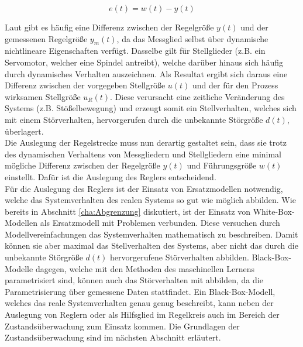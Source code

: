 \begin{equation}
e(t) = w(t) - y(t)
\end{equation}


Laut \cite{Lunze.2013} gibt es häufig eine Differenz zwischen der Regelgröße $y(t)$ und der gemessenen Regelgröße $y_m(t)$, da das Messglied selbst über dynamische nichtlineare Eigenschaften verfügt. Dasselbe gilt für Stellglieder (z.B. ein Servomotor, welcher eine Spindel antreibt), welche darüber hinaus sich häufig durch dynamisches Verhalten auszeichnen. Als Resultat ergibt sich daraus eine Differenz zwischen der vorgegeben Stellgröße $u(t)$ und der für den Prozess wirksamen Stellgröße $u_R(t)$. Diese verursacht eine zeitliche Veränderung des Systems (z.B. Stößelbewegung) und erzeugt somit ein Stellverhalten, welches sich mit einem Störverhalten, hervorgerufen durch die unbekannte Störgröße $d(t)$, überlagert. \cite{Lunze.2013} \\ 
Die Auslegung der Regelstrecke muss nun derartig gestaltet sein, dass sie trotz des dynamischen Verhaltens von Messgliedern und Stellgliedern eine minimal mögliche Differenz zwischen der Regelgröße $y(t)$ und Führungsgröße $w(t)$ einstellt. Dafür ist die Auslegung des Reglers entscheidend. \\ 
Für die Auslegung des Reglers ist der Einsatz von Ersatzmodellen notwendig, welche das Systemverhalten des realen Systems so gut wie möglich abbilden. Wie bereits in Abschnitt \ref{cha:Abgrenzung} diskutiert, ist der Einsatz von White-Box-Modellen als Ersatzmodell mit Problemen verbunden. Diese versuchen durch Modellvereinfachungen das Systemverhalten mathematisch zu beschreiben. Damit können sie aber maximal das Stellverhalten des Systems, aber nicht das durch die unbekannte Störgröße $d(t)$ hervorgerufene Störverhalten abbilden. Black-Box-Modelle dagegen, welche mit den Methoden des maschinellen Lernens parametrisiert sind, können auch das Störverhalten mit abbilden, da die Parametrisierung über gemessene Daten stattfindet. Ein Black-Box-Modell, welches das reale Systemverhalten genau genug beschreibt, kann neben der Auslegung von Reglern oder als Hilfsglied im Regelkreis auch im Bereich der Zustandsüberwachung zum Einsatz kommen. Die Grundlagen der Zustandsüberwachung sind im nächsten Abschnitt erläutert.




